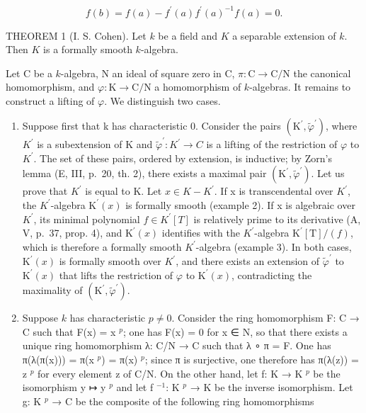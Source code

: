 \[
f (b) = f (a) - f ^ {\prime} (a) f ^ {\prime} (a) ^ {- 1} f (a) = 0.
\]

THEOREM 1 (I. S. Cohen). Let \(k\) be a field and \(K\) a separable extension of \(k\). Then \(K\) is a formally smooth \(k\)-algebra.

Let C be a \(k\)-algebra, N an ideal of square zero in C, \(\pi: \mathrm{C} \to \mathrm{C/N}\) the canonical homomorphism, and \(\varphi: \mathrm{K} \to \mathrm{C/N}\) a homomorphism of \(k\)-algebras. It remains to construct a lifting of \(\varphi\). We distinguish two cases.

\begin{enumerate}
\def\labelenumi{\Alph{enumi})}
\item
  Suppose first that k has characteristic 0. Consider the pairs \((\mathrm{K}^{\prime}, \tilde{\varphi}^{\prime})\), where \(K^{\prime}\) is a subextension of K and \(\tilde{\varphi}^{\prime}: K^{\prime} \to C\) is a lifting of the restriction of \(\varphi\) to \(K^{\prime}\). The set of these pairs, ordered by extension, is inductive; by Zorn's lemma (E, III, p.~20, th. 2), there exists a maximal pair \((\mathrm{K}^{\prime}, \tilde{\varphi}^{\prime})\). Let us prove that \(K^{\prime}\) is equal to K. Let \(x \in K - K^{\prime}\). If x is transcendental over \(K^{\prime}\), the \(K^{\prime}\)-algebra \(\mathrm{K}^{\prime}(x)\) is formally smooth (example 2). If x is algebraic over \(K^{\prime}\), its minimal polynomial \(f \in K^{\prime}[T]\) is relatively prime to its derivative (A, V, p.~37, prop. 4), and \(\mathrm{K}^{\prime}(x)\) identifies with the \(K^{\prime}\)-algebra \(\mathrm{K}^{\prime}[\mathrm{T}]/(f)\), which is therefore a formally smooth \(K^{\prime}\)-algebra (example 3). In both cases, \(\mathrm{K}^{\prime}(x)\) is formally smooth over \(K^{\prime}\), and there exists an extension of \(\tilde{\varphi}^{\prime}\) to \(\mathrm{K}^{\prime}(x)\) that lifts the restriction of \(\varphi\) to \(\mathrm{K}^{\prime}(x)\), contradicting the maximality of \((\mathrm{K}^{\prime}, \tilde{\varphi}^{\prime})\).
\item
  Suppose \(k\) has characteristic \(p \neq 0\). Consider the ring homomorphism F: C → C such that F(x) = x \(^{p}\); one has F(x) = 0 for x ∈ N, so that there exists a unique ring homomorphism λ: C/N → C such that λ ∘ π = F. One has π(λ(π(x))) = π(x \(^{p}\)) = π(x) \(^{p}\); since π is surjective, one therefore has π(λ(z)) = z \(^{p}\) for every element z of C/N. On the other hand, let f: K → K \(^{p}\) be the isomorphism y ↦ y \(^{p}\) and let f \(^{-1}\): K \(^{p}\) → K be the inverse isomorphism. Let g: K \(^{p}\) → C be the composite of the following ring homomorphisms
\end{enumerate}

